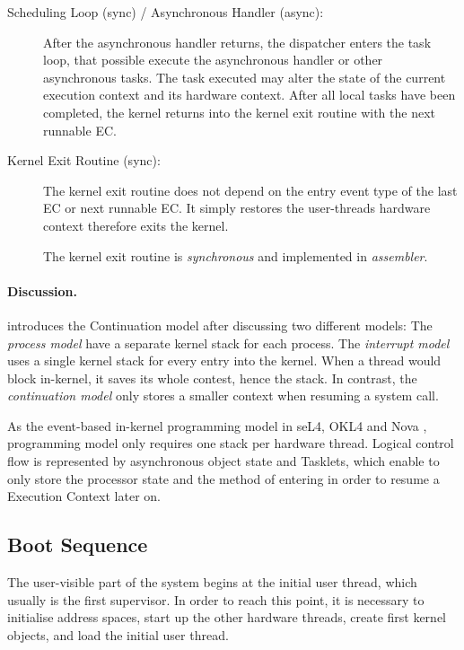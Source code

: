 \begin{description}
\item[Scheduling Loop (sync) / Asynchronous Handler (async):]
After the asynchronous handler returns, the dispatcher enters the task loop, that possible execute the asynchronous handler or other asynchronous tasks. The task executed may alter the state of the current execution context and its hardware context.
After all local tasks have been completed, the kernel returns into the kernel exit routine with the next runnable EC.

\item[Kernel Exit Routine (sync):]
The kernel exit routine does not depend on the entry event type of the last EC or next runnable EC. It simply restores the user-threads hardware context therefore exits the kernel.

The kernel exit routine is \emph{synchronous} and implemented in \emph{assembler}.

\end{description}


\paragraph{Discussion.}
\cite{DravesBershadRashidEtAl1991} introduces the Continuation model after discussing two different models:
The \emph{process model} have a separate kernel stack for each process.
The \emph{interrupt model} uses a single kernel stack for every entry into the kernel. When a thread would block in-kernel, it saves its whole contest, hence the stack.
In contrast, the \emph{continuation model} only stores a smaller context when resuming a system call.

As the event-based in-kernel programming model in seL4, OKL4 and Nova \cite{Heiser:2016:LML:2912578.2893177}, \mythos programming model only requires one stack per hardware thread. Logical control flow is represented by asynchronous object state and Tasklets, which enable \mythos to only store the processor state and the method of entering in order to resume a Execution Context later on.

\subsection{Boot Sequence}
\label{sec:boot-dyn}
The user-visible part of the system begins at the initial user thread, which usually is the first supervisor. In order to reach this point, it is necessary to initialise address spaces, start up the other hardware threads, create first kernel objects, and load the initial user thread.

